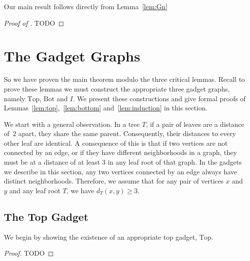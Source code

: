 \documentclass[11pt,letter]{article}
\theoremstyle{remark}
\newcommand{\T}{\text{Top}}
\newcommand{\B}{\text{Bot}}
\begin{document}
Our main result follows directly from Lemma~\ref{lem:Gn}

\begin{proof}[Proof of ]
TODO
\end{proof}





\section{The Gadget Graphs}\label{sec:gadgets}

So we have proven the main theorem modulo the three critical lemmas.
Recall to prove these lemmas we must construct the appropriate three gadget graphs, namely $\T$, $\B$ and $I$.
We present these constructions and give formal proofs of 
Lemmas~\ref{lem:top},~\ref{lem:bottom} and~\ref{lem:induction} in this section.

We start with a general observation. In a tree $T$, if a pair of leaves are a distance of~$2$ apart, they share the same parent. Consequently, their distances to every other leaf are identical. A consequence of this is that if two vertices are not connected by an edge, or if they have different neighborhoods in a graph, they must be at a distance of at least $3$ in any leaf root of that graph. In the gadgets we describe in this section, any two vertices connected by an edge always have distinct neighborhoods. Therefore, we assume that for any pair of vertices $x$ and $y$ and any leaf root $T$, we have $d_T(x, y) \geq 3$.


\subsection{The Top Gadget}\label{sec:top}

We begin by showing the existence of an appropriate top gadget, $\T$.

\top*
\begin{proof}
TODO
\end{proof}
\end{document}
